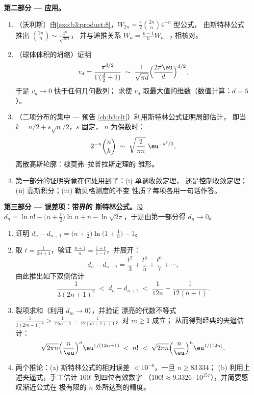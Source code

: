 \begin{problem}
\medskip
\noindent\textbf{第二部分 --- 应用。}
\begin{enumerate}[resume]
  \item （沃利斯）由\cref{exo:b3:product:8}，$W_{2n} =
        \frac\pi2\binom{2n}n4^{-n}$ 型公式，
        由斯特林公式推出 $\binom{2n}{n} \sim \frac{4^n}{\sqrt{\pi n}}$，
        并与递推关系 $W_{n} =
        \frac{n-1}nW_{n-2}$ 相核对。
  \item （球体体积的坍缩）证明
        \[
        v_d = \frac{\pi^{d/2}}{\Gamma(\frac d2 + 1)}
        \;\sim\; \frac{1}{\sqrt{\pi d}}
        \Bigl(\frac{2\pi\eu}{d}\Bigr)^{d/2},
        \]
        于是 $v_d \to 0$ 快于任何几何数列；
        求使 $v_d$ 取最大值的维数（数值计算：$d =
        5$）。
  \item （二项分布的集中 --- 预告
        \cref{ch:b3:clt}）利用斯特林公式证明局部估计，
        即当 $k = n/2 + s\sqrt n/2$，$s$ 固定，
        $n$ 为偶数时：
        \[
        2^{-n}\binom{n}{k} \;\sim\;
        \sqrt{\frac{2}{\pi n}}\;\eu^{-s^2/2},
        \]
        离散高斯轮廓：棣莫弗--拉普拉斯定理的
        雏形。
  \item 第一部分的证明究竟在何处用到了：(i) 单调收敛定理，
        还是控制收敛定理；(ii) 高斯积分；(iii) 勒贝格测度的不变
        性质？每项各用一句话作答。
\end{enumerate}

\medskip
\noindent\textbf{第三部分 --- 误差项：带界的
斯特林公式。}设 $d_n = \ln n! - \bigl(n + \tfrac12\bigr)\ln n + n -
\ln\sqrt{2\pi}$，于是由第一部分得 $d_n \to 0$。
\begin{enumerate}[resume]
  \item 证明 $d_n - d_{n+1} = \bigl(n +
        \tfrac12\bigr)\ln\bigl(1 + \tfrac1n\bigr) - 1$。
  \item 取 $t = \frac1{2n+1}$，验证 $\frac{n+1}n =
        \frac{1+t}{1-t}$，并展开：
        \[
        d_n - d_{n+1} = \frac{t^2}3 + \frac{t^4}5 +
        \frac{t^6}7 + \cdots,
        \]
        由此推出如下双侧估计
        \[
        \frac1{3(2n+1)^2} \;<\; d_n - d_{n+1} \;<\;
        \frac1{12n} - \frac1{12(n+1)} .
        \]
  \item 裂项求和（利用 $d_m \to 0$），并验证
        漂亮的代数不等式 $\frac1{3(2m+1)^2} >
        \frac1{12m+1} - \frac1{12(m+1)+1}$，对 $m \geq 1$ 成立；
        从而得到经典的夹逼估计：
        \[
        \sqrt{2\pi n}\Bigl(\frac n\eu\Bigr)^n
        \eu^{1/(12n+1)} \;<\; n! \;<\;
        \sqrt{2\pi n}\Bigl(\frac n\eu\Bigr)^n\eu^{1/(12n)} .
        \]
  \item 两个推论：(a) 斯特林公式的相对误差
        $< 10^{-6}$，一旦 $n \geq 83\,334$；
        (b) 利用上述夹逼式，手工估计 $100!$ 到四位有效数字
        （$100! \approx 9.3326\cdot
        10^{157}$），并简要感叹渐近公式在
        极有限的 $n$ 处所达到的精度。
\end{enumerate}


\end{problem}

